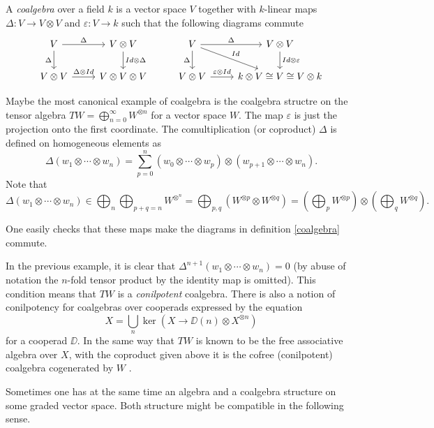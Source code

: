 \documentclass[TFM.tex]{subfiles}
\begin{document}
\begin{defi}\label{coalgebra}
A \emph{coalgebra} over a field $k$ is a vector space $V$ together with $k$-linear maps $\Delta:V\to V\otimes V$ and $\varepsilon:V\to k$ such that the following diagrams commute
\[
\begin{tikzcd}
V \arrow[r, "\Delta"] \arrow[d, "\Delta"'] & V\otimes V \arrow[d, "Id\otimes\Delta"] & V \arrow[r, "\Delta"] \arrow[d, "\Delta"'] \arrow[rd, "Id"] & V\otimes V \arrow[d, "Id\otimes\varepsilon"] \\
V\otimes V \arrow[r, "\Delta\otimes Id"]   & V\otimes V\otimes V                     & V\otimes V \arrow[r, "\varepsilon\otimes Id"]               & k\otimes V\cong V\cong V\otimes k           
\end{tikzcd}
\]
\end{defi}

\begin{ex}\label{cofree}
Maybe the most canonical example of coalgebra is the coalgebra structre on the tensor algebra $TW=\bigoplus_{n=0}^\infty W^{\otimes n}$ for a vector space $W$. The map $\varepsilon$ is just the projection onto the first coordinate. The comultiplication (or coproduct) $\Delta$ is defined on homogeneous elements as
\[
\Delta(w_1\otimes\cdots\otimes w_n)=\sum_{p=0}^n(w_0\otimes\cdots \otimes w_p)\otimes (w_{p+1}\otimes\cdots\otimes w_n).
\]
Note that $$\Delta(w_1\otimes\cdots\otimes w_n)\in\bigoplus_n\bigoplus_{p+q=n}W^{\otimes^n}=\bigoplus_{p,q}\left(W^{\otimes p}\otimes W^{\otimes q}\right)=\left(\bigoplus_p W^{\otimes p}\right)\otimes \left(\bigoplus_q W^{\otimes q}\right).$$ 

One easily checks that these maps make the diagrams in definition \ref{coalgebra} commute.
\end{ex}

In the previous example, it is clear that $\Delta^{n+1}(w_1\otimes\cdots\otimes w_n)=0$ (by abuse of notation the $n$-fold tensor product by the identity map is omitted). This condition means that $TW$ is a \emph{conilpotent} coalgebra. There is also a notion of conilpotency for coalgebras over cooperads expressed by the equation
\[
X=\bigcup_n\ker(X\to \DD(n)\otimes X^{\otimes n})
\]
for a cooperad $\DD$. In the same way that $TW$ is known to be the free associative algebra over $X$, with the coproduct given above it is the cofree (conilpotent) coalgebra cogenerated by $W$ \cite[Proposition 2.1 of .6]{AlgebraicOperads}.

Sometimes one has at the same time an algebra and a coalgebra structure on some graded vector space. Both structure might be compatible in the following sense.
\end{document}
